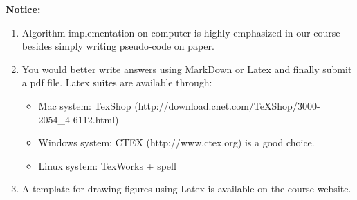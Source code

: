 \documentclass[12pt]{article}
\begin{document}
{\bf Notice:}
\begin{enumerate}  
\item Algorithm implementation on computer is highly emphasized in our course besides simply writing pseudo-code on paper. 
\item You would better write answers using MarkDown or Latex and finally submit a pdf file. Latex suites are available through: 
\begin{itemize}
\item Mac system: TexShop (http://download.cnet.com/TeXShop/3000-2054\_4-6112.html)
\item Windows system: CTEX (http://www.ctex.org) is a good choice. 
\item Linux system: TexWorks + spell 
\end{itemize} 
\item A template for drawing figures using Latex is available on the course website. 
\end{enumerate} 

\end{document}
